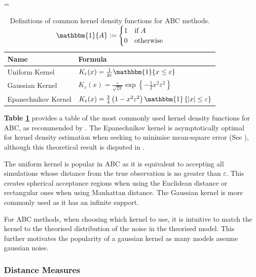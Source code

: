 \documentclass[11pt,a4paper]{article}
\theoremstyle{break}
\begin{document}
  \begin{table}[H]
    \everymath={\displaystyle}
    \centering
    \begin{tabular}{|l|l|}
      \hline
      \textbf{Name}&\textbf{Formula}\\\hline
      Uniform Kernel&$K_\varepsilon(x)=\frac1{2\varepsilon}\mathbbm{1}\{x\leq\varepsilon\}$\\\hline
      Gaussian Kernel&$K_\varepsilon(x)=\frac\varepsilon{\sqrt{2\pi}}\exp\left\{-\frac12x^2\varepsilon^2\right\}$\\\hline
      Epanechnikov Kernel&$K_\varepsilon(x)=\frac34\left(1-x^2\varepsilon^2\right)\mathbbm{1}\left\{|x|\leq\varepsilon\right\}$\\
      \hline
    \end{tabular}
    \caption{Definitions of common kernel density functions for ABC methods. $\mathbbm{1}\{A\}:=\begin{cases}1&\text{if }A\\0&\text{otherwise}\end{cases}$}
    \label{tab_common_kernels}
  \end{table}

  \par \textbf{Table \ref{tab_common_kernels}} provides a table of the most commonly used kernel density functions for ABC, as recommended by \cite[]{annual_review_of_statistics_ABC}. The Epanechnikov kernel is asymptotically optimal for kernel density estimation when seeking to minimise mean-square error (See \cite[]{non_parameteric_estimation_of_a_multivariate_probability_density}), although this theoretical result is disputed in \cite[]{introduction_to_nonparametric_estimation}.

  \par The uniform kernel is popular in ABC as it is equivalent to accepting all simulations whose distance from the true observation is no greater than $\varepsilon$. This creates spherical acceptance regions when using the Euclidean distance or rectangular ones when using Manhattan distance. The Gaussian kernel is more commonly used as it has an infinite support.

  \par For ABC methods, when choosing which kernel to use, it is intuitive to match the kernel to the theorised distribution of the noise in the theorised model. This further motivates the popularity of a gaussian kernel as many models assume gaussian noise.

\subsubsection*{Distance Measures}\label{sec_distance_measures}
\end{document}
